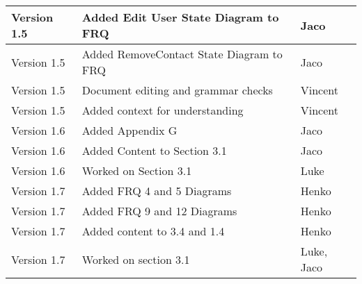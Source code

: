 \begin{center}
\begin{tabular}{|l|l|l|}
\hline
Version 1.5 & Added Edit User State Diagram to FRQ & Jaco\\
\hline
Version 1.5 & Added RemoveContact State Diagram to FRQ&Jaco\\
\hline
Version 1.5 & Document editing and grammar checks & Vincent\\
\hline
Version 1.5 & Added context for understanding & Vincent\\
\hline
Version 1.6 & Added Appendix G& Jaco\\
\hline
Version 1.6 & Added Content to Section 3.1&Jaco\\
\hline
Version 1.6 & Worked on Section 3.1&Luke\\
\hline
Version 1.7 & Added FRQ 4 and 5 Diagrams&Henko\\
\hline
Version 1.7 & Added FRQ 9 and 12 Diagrams&Henko\\
\hline
Version 1.7 & Added content to 3.4 and 1.4 &Henko\\
\hline
Version 1.7 & Worked on section 3.1&Luke, Jaco\\
\hline
\end{tabular}
\end{center}